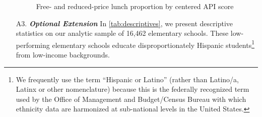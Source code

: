 \documentclass[a4paper, 11pt]{article}
\begin{document}
\begin{enumerate}
\begin{figure} 
\begin{center}
\caption{Free- and reduced-price lunch proportion by centered API score}
\label{fig:manip}
\end{center}
\end{figure}

	\item[A3.] \textbf{\textit{Optional Extension}} In \autoref{tab:descriptives}, we present descriptive statistics on our analytic sample of 16,462 elementary schools. These low-performing elementary schools educate disproportionately Hispanic students\footnote{We frequently use the term ``Hispanic or Latino'' (rather than Latino/a, Latinx or other nomenclature) because this is the federally recognized term used by the Office of Management and Budget/Census Bureau with which ethnicity data are harmonized at sub-national levels in the United States.} from low-income backgrounds. 


\end{enumerate}
\end{document}
